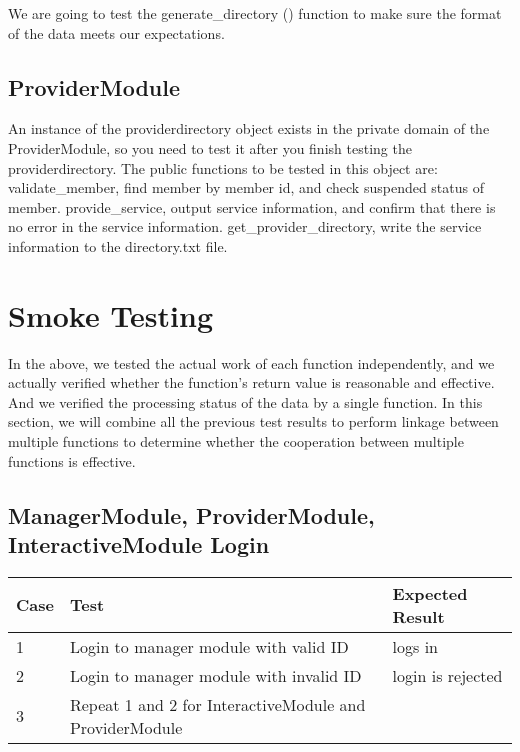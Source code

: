 \documentclass{article}
\begin{document}
We are going to test the generate_directory () function to make sure the
format of the data meets our expectations.

\subsection{ProviderModule}

An instance of the providerdirectory object exists in the private domain of
the ProviderModule, so you need to test it after you finish testing the
providerdirectory. The public functions to be tested in this object are:
validate_member, find member by member id, and check suspended
status of member.
provide_service, output service information, and confirm that there is no
error in the service information.
get_provider_directory, write the service information to the directory.txt
file.

\section{Smoke Testing}
In the above, we tested the actual work of each function independently, and we
actually verified whether the function's return value is reasonable and effective.
And we verified the processing status of the data by a single function. In this
section, we will combine all the previous test results to perform linkage between
multiple functions to determine whether the cooperation between multiple
functions is effective.

\subsection{ManagerModule, ProviderModule, InteractiveModule Login}
\begin{tabular}{ |l|l|l| }
   \hline
   Case  &              Test           &     Expected Result          \\
   \hline
   \hline
   1     &    Login to manager module with valid ID      &   logs in    \\
   \hline
   2     &    Login to manager module with invalid ID    &   login is rejected  \\
   \hline
   3     &    Repeat 1 and 2 for InteractiveModule and ProviderModule &          \\
   \hline
\end{tabular}
\end{document}
